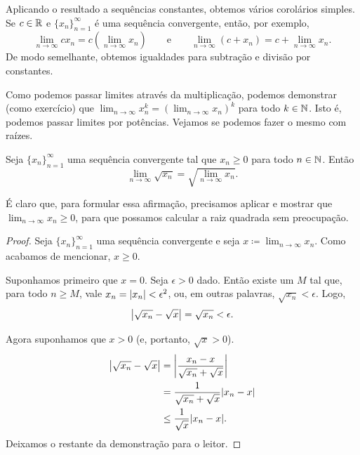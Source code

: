 Aplicando o resultado a sequências constantes, obtemos vários corolários simples.
Se $c \in {\mathbb{R}}$ e $\{ x_n \}_{n=1}^\infty$ é uma sequência convergente, então,
por exemplo,
\begin{equation*}
\lim_{n \to \infty} c x_n =
c \left( \lim_{n \to \infty} x_n \right) \qquad
\text{e}
\qquad
\lim_{n \to \infty} (c + x_n) =
c + \lim_{n \to \infty} x_n .
\end{equation*}
De modo semelhante, obtemos igualdades para subtração e divisão por constantes.

Como podemos passar limites através da multiplicação, podemos demonstrar (como exercício)
que $\lim_{n\to\infty} x_n^k = {(\lim_{n\to\infty} x_n)}^k$ para todo $k \in {\mathbb{N}}$.
Isto é, podemos passar limites
por potências. Vejamos se podemos fazer o mesmo com raízes.

\begin{prop}
\pagebreak[2]
Seja $\{ x_n \}_{n=1}^\infty$ uma sequência convergente tal
que $x_n \geq 0$ para todo $n \in {\mathbb{N}}$.
Então
\begin{equation*}
\lim_{n\to\infty} \sqrt{x_n} =
\sqrt{ \lim_{n\to\infty} x_n } .
\end{equation*}
\end{prop}

É claro que, para formular essa afirmação, precisamos aplicar
 e mostrar
que
$\lim_{n\to\infty} x_n \geq 0$, para que possamos calcular a raiz quadrada sem
preocupação.

\begin{proof}
Seja $\{ x_n \}_{n=1}^\infty$ uma sequência convergente e seja $x \coloneqq
\lim_{n\to\infty} x_n$.
Como acabamos de mencionar, $x \geq 0$.

Suponhamos primeiro que $x=0$. Seja $\epsilon > 0$ dado.
Então existe um $M$ tal que, para todo $n \geq M$, vale
$x_n = \lvert {x_n} \rvert < \epsilon^2$, ou, em outras palavras, $\sqrt{x_n} < \epsilon$.
Logo,
\begin{equation*}
\left\lvert {\sqrt{x_n} - \sqrt{x}} \right\rvert =
\sqrt{x_n} < \epsilon.
\end{equation*}

Agora suponhamos que $x > 0$ (e, portanto, $\sqrt{x} > 0$).
\begin{equation*}
\begin{split}
\left\lvert {\sqrt{x_n}-\sqrt{x}} \right\rvert &=
\left\lvert {\frac{x_n-x}{\sqrt{x_n}+\sqrt{x}}} \right\rvert \\
&=
\frac{1}{\sqrt{x_n}+\sqrt{x}}
\lvert {x_n-x} \rvert \\
& \leq
\frac{1}{\sqrt{x}}
\lvert {x_n-x} \rvert .
\end{split}
\end{equation*}
Deixamos o restante da demonstração para o leitor.
\end{proof}

